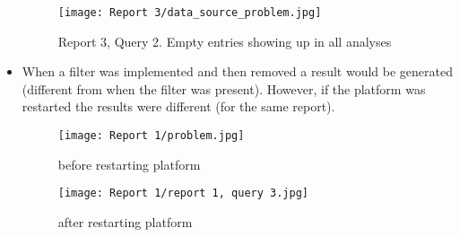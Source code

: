\begin{itemize}
\begin{figure}
\centering
     \texttt{[image: Report 3/data\_source\_problem.jpg]}
      \caption{Report 3, Query 2. Empty entries showing up in all analyses}
       \label{normal_case}
\end{figure}

\item When a filter was implemented and then removed a result would be generated (different from when the filter was present). However, if the platform was restarted the results were different (for the same report).

\begin{figure}
\centering
     \texttt{[image: Report 1/problem.jpg]}
      \caption{before restarting platform}
       \label{normal_case}
\end{figure}

\begin{figure}
\centering
     \texttt{[image: Report 1/report 1, query 3.jpg]}
      \caption{after restarting platform}
       \label{normal_case}
\end{figure}

\end{itemize}

